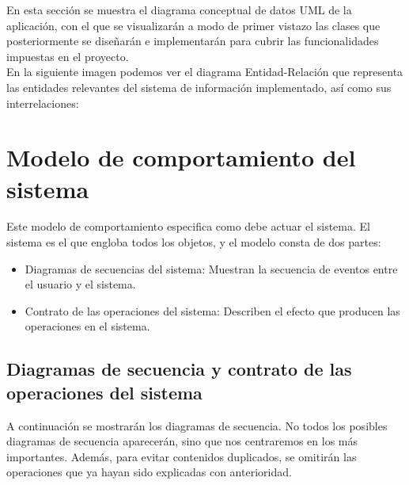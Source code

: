 En esta sección se muestra el diagrama conceptual de datos UML de la aplicación, con el que se visualizarán a modo de primer vistazo las clases que posteriormente se diseñarán e implementarán para cubrir las funcionalidades impuestas en el proyecto.\\

En la siguiente imagen podemos ver el diagrama Entidad-Relación que representa las entidades relevantes del sistema de información implementado, así como sus interrelaciones:


\section{Modelo de comportamiento del sistema}

Este modelo de comportamiento especifica como debe actuar el sistema. El sistema es el que engloba todos los objetos, y el modelo consta de dos partes:

\begin{itemize}
\item Diagramas de secuencias del sistema: Muestran la secuencia de eventos entre el usuario y el sistema.
\item Contrato de las operaciones del sistema: Describen el efecto que producen las operaciones en el sistema.
\end{itemize}

\subsection{Diagramas de secuencia y contrato de las operaciones del sistema}

A continuación se mostrarán los diagramas de secuencia. No todos los posibles diagramas de secuencia aparecerán, sino que nos centraremos en los más importantes. Además, para evitar contenidos duplicados, se omitirán las operaciones que ya hayan sido explicadas con anterioridad.














